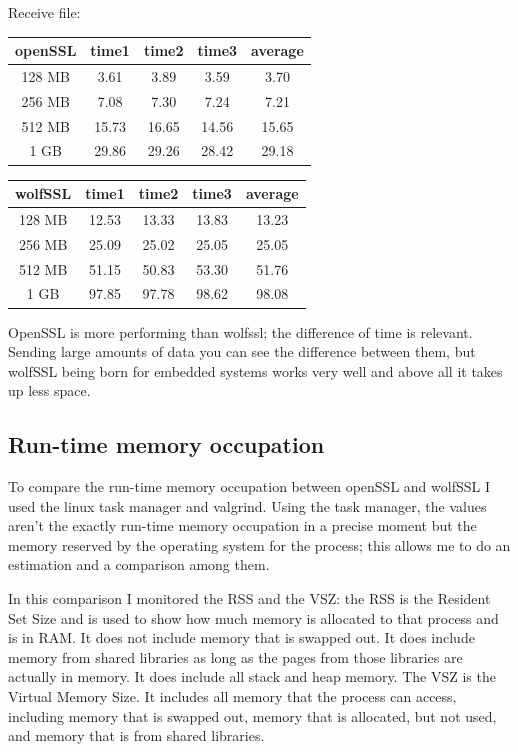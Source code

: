 \documentclass[a4paper,12pt]{article}
\begin{document}
Receive file:\\
\begin{tabular}{ ||c|c|c|c|c|| } 
 \hline
 \textbf{openSSL} & time1 & time2 & time3 & average \\ 
 \hline
 128 MB & 3.61& 3.89& 3.59& 3.70\\ 
 \hline
 256 MB & 7.08& 7.30& 7.24& 7.21\\ 
 \hline
 512 MB & 15.73& 16.65& 14.56& 15.65\\ 
 \hline
 1 GB  & 29.86& 29.26& 28.42& 29.18\\ 
 \hline
\end{tabular}
\newline
\begin{tabular}{ ||c|c|c|c|c|| } 
 \hline
 \textbf{wolfSSL} & time1 & time2 & time3 & average \\ 
 \hline
128 MB & 12.53& 13.33& 13.83& 13.23\\ 
 \hline
 256 MB & 25.09& 25.02& 25.05& 25.05\\ 
 \hline
 512 MB & 51.15& 50.83& 53.30& 51.76\\ 
 \hline
 1 GB  & 97.85& 97.78& 98.62& 98.08\\ 
 \hline
\end{tabular}
\newline

OpenSSL is more performing than wolfssl; the difference of time is relevant.
Sending large amounts of data you can see the difference between them, but wolfSSL being born for embedded systems works very well and above all it takes up less space.

\subsection{Run-time memory occupation}
To compare the run-time memory occupation between openSSL and wolfSSL I used the linux task manager and valgrind. Using the task manager, the values aren't the exactly run-time memory occupation in a precise moment but the memory reserved by the operating system for the process; this allows me to do an estimation and a comparison among them.

In this comparison I monitored the RSS and the VSZ:
the RSS is the Resident Set Size and is used to show how much memory is allocated to that process and is in RAM. It does not include memory that is swapped out. It does include memory from shared libraries as long as the pages from those libraries are actually in memory. It does include all stack and heap memory.
The VSZ is the Virtual Memory Size. It includes all memory that the process can access, including memory that is swapped out, memory that is allocated, but not used, and memory that is from shared libraries.
\end{document}

